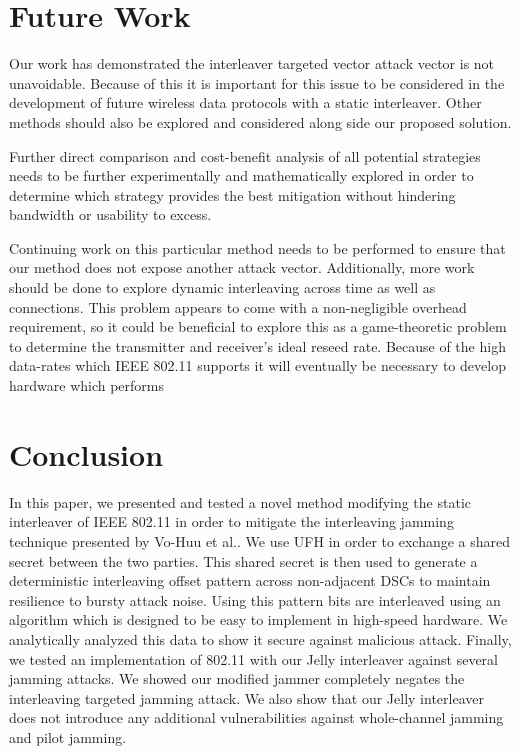 \documentclass[sigconf]{acmart}
\begin{document}
\section{Future Work}
\label{sec:continuing}

Our work has demonstrated the interleaver targeted vector attack vector is not unavoidable. Because of this it is important for this issue to be considered in the development of future wireless data protocols with a static interleaver. Other methods should also be explored and considered along side our proposed solution.

Further direct comparison and cost-benefit analysis of all potential strategies needs to be further experimentally and mathematically explored in order to determine which strategy provides the best mitigation without hindering bandwidth or usability to excess.

Continuing work on this particular method needs to be performed to ensure that our method does not expose another attack vector. Additionally, more work should be done to explore dynamic interleaving across time as well as connections. This problem appears to come with a non-negligible overhead requirement, so it could be beneficial to explore this as a game-theoretic problem to determine the transmitter and receiver's ideal reseed rate. Because of the high data-rates which IEEE 802.11 supports it will eventually be necessary to develop hardware which performs 

\section{Conclusion}
\label{sec:conclusion}

In this paper, we  presented and tested a novel method modifying the static interleaver of IEEE 802.11 in order to mitigate the interleaving jamming technique presented by Vo-Huu et al.. We use UFH in order to exchange a shared secret between the two parties. This shared secret is then used to generate a deterministic interleaving offset pattern across non-adjacent DSCs to maintain resilience to bursty attack noise. Using this pattern bits are interleaved using an algorithm which is designed to be easy to implement in high-speed hardware. We analytically analyzed this data to show it secure against malicious attack. Finally, we tested an implementation of 802.11 with our Jelly interleaver against several jamming attacks. We showed our modified jammer completely negates the interleaving targeted jamming attack. We also show that our Jelly interleaver does not introduce any additional vulnerabilities against whole-channel jamming and pilot jamming. 
\end{document}
